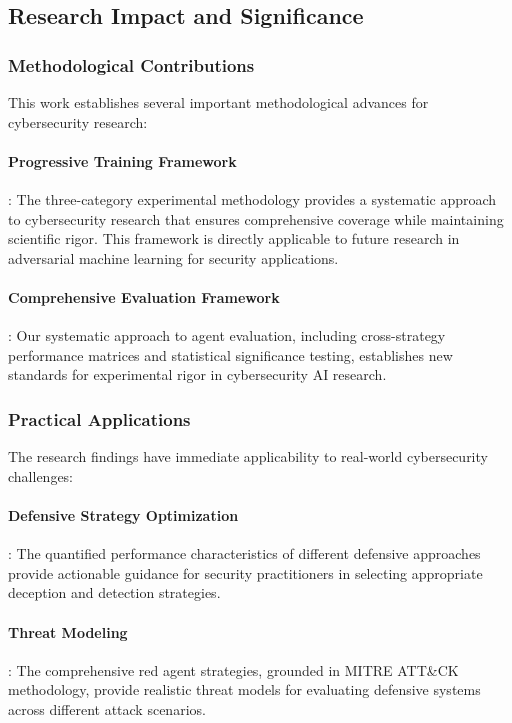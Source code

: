 \documentclass[12pt,oneside]{article}
\begin{document}
\subsection{Research Impact and Significance}

\subsubsection{Methodological Contributions}
This work establishes several important methodological advances for cybersecurity research:


\paragraph{Progressive Training Framework}: The three-category experimental methodology provides a systematic approach to cybersecurity research that ensures comprehensive coverage while maintaining scientific rigor. This framework is directly applicable to future research in adversarial machine learning for security applications.

\paragraph{Comprehensive Evaluation Framework}: Our systematic approach to agent evaluation, including cross-strategy performance matrices and statistical significance testing, establishes new standards for experimental rigor in cybersecurity AI research.

\subsubsection{Practical Applications}
The research findings have immediate applicability to real-world cybersecurity challenges:

\paragraph{Defensive Strategy Optimization}: The quantified performance characteristics of different defensive approaches provide actionable guidance for security practitioners in selecting appropriate deception and detection strategies.

\paragraph{Threat Modeling}: The comprehensive red agent strategies, grounded in MITRE ATT\&CK methodology, provide realistic threat models for evaluating defensive systems across different attack scenarios.
\end{document}
